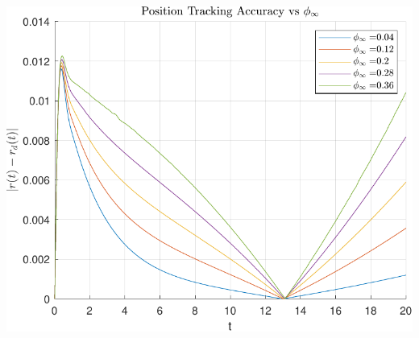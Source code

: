 \documentclass[a4paper,12pt]{article}
\begin{document}
\begin{minipage}[t]{0.45\textwidth}
    \centering
    \includegraphics[width=\linewidth]{plot/task2_position_tracking_accuracy_vs_phi_infty.pdf}
    \label{fig:task2_position_tracking_accuracy_vs_phi_infty}
\end{minipage}
\end{document}

